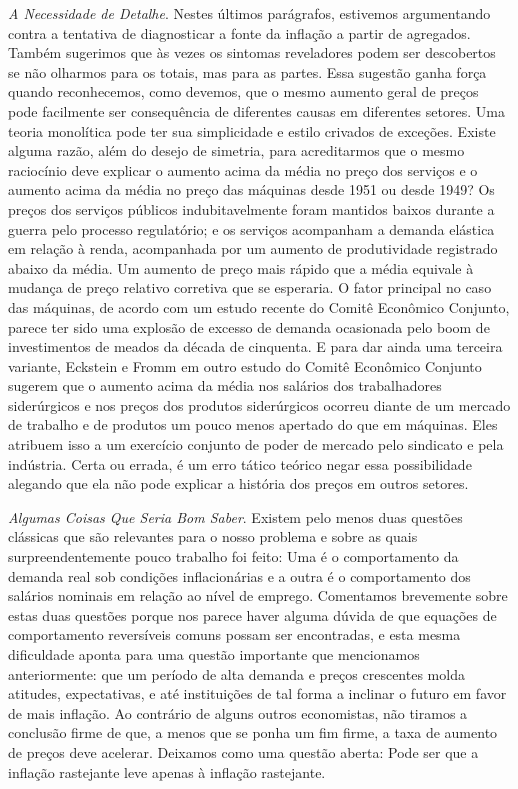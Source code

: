 \documentclass[12pt]{article}
\begin{document}
\textit{A Necessidade de Detalhe}. Nestes últimos parágrafos, estivemos argumentando contra a tentativa de diagnosticar a fonte da inflação a partir de agregados. Também sugerimos que às vezes os sintomas reveladores podem ser descobertos se não olharmos para os totais, mas para as partes. Essa sugestão ganha força quando reconhecemos, como devemos, que o mesmo aumento geral de preços pode facilmente ser consequência de diferentes causas em diferentes setores. Uma teoria monolítica pode ter sua simplicidade e estilo crivados de exceções. Existe alguma razão, além do desejo de simetria, para acreditarmos que o mesmo raciocínio deve explicar o aumento acima da média no preço dos serviços e o aumento acima da média no preço das máquinas desde 1951 ou desde 1949? Os preços dos serviços públicos indubitavelmente foram mantidos baixos durante a guerra pelo processo regulatório; e os serviços acompanham a demanda elástica em relação à renda, acompanhada por um aumento de produtividade registrado abaixo da média. Um aumento de preço mais rápido que a média equivale à mudança de preço relativo corretiva que se esperaria. O fator principal no caso das máquinas, de acordo com um estudo recente do Comitê Econômico Conjunto, parece ter sido uma explosão de excesso de demanda ocasionada pelo boom de investimentos de meados da década de cinquenta. E para dar ainda uma terceira variante, Eckstein e Fromm em outro estudo do Comitê Econômico Conjunto sugerem que o aumento acima da média nos salários dos trabalhadores siderúrgicos e nos preços dos produtos siderúrgicos ocorreu diante de um mercado de trabalho e de produtos um pouco menos apertado do que em máquinas. Eles atribuem isso a um exercício conjunto de poder de mercado pelo sindicato e pela indústria. Certa ou errada, é um erro tático teórico negar essa possibilidade alegando que ela não pode explicar a história dos preços em outros setores.

\textit{Algumas Coisas Que Seria Bom Saber}. Existem pelo menos duas questões clássicas que são relevantes para o nosso problema e sobre as quais surpreendentemente pouco trabalho foi feito: Uma é o comportamento da demanda real sob condições inflacionárias e a outra é o comportamento dos salários nominais em relação ao nível de emprego. Comentamos brevemente sobre estas duas questões porque nos parece haver alguma dúvida de que equações de comportamento reversíveis comuns possam ser encontradas, e esta mesma dificuldade aponta para uma questão importante que mencionamos anteriormente: que um período de alta demanda e preços crescentes molda atitudes, expectativas, e até instituições de tal forma a inclinar o futuro em favor de mais inflação. Ao contrário de alguns outros economistas, não tiramos a conclusão firme de que, a menos que se ponha um fim firme, a taxa de aumento de preços deve acelerar. Deixamos como uma questão aberta: Pode ser que a inflação rastejante leve apenas à inflação rastejante.
\end{document}
